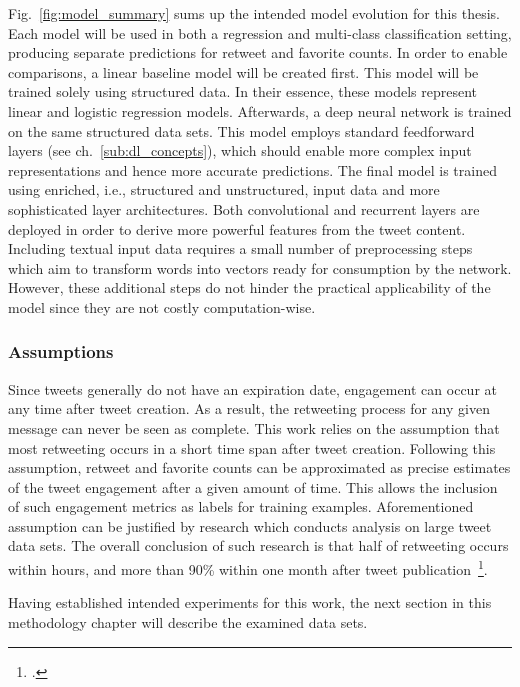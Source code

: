 Fig.~\ref{fig:model_summary} sums up the intended model evolution for this thesis.
Each model will be used in both a regression and multi-class classification
setting, producing separate predictions for retweet and favorite counts.
In order to enable comparisons, a linear baseline model will be created first.
This model will be trained solely using structured data.
In their essence, these models represent linear and logistic regression models.
Afterwards, a deep neural network is trained on the same structured data sets.
This model employs standard feedforward layers (see ch.~\ref{sub:dl_concepts}),
which should enable more complex input representations and hence more accurate
predictions.
The final model is trained using enriched, i.e., structured and unstructured,
input data and more sophisticated layer architectures.
Both convolutional and recurrent layers are deployed in order to derive more
powerful features from the tweet content. 
Including textual input data requires a small number of preprocessing steps which aim
to transform words into vectors ready for consumption by the network.
However, these additional steps do not hinder the practical applicability
of the model since they are not costly computation-wise.

\subsubsection{Assumptions}

Since tweets generally do not have an expiration date, engagement can occur
at any time after tweet creation.
As a result, the retweeting process for any given message can never be seen
as complete.
This work relies on the assumption that most retweeting occurs in a short time
span after tweet creation.
Following this assumption, retweet and favorite counts can be approximated
as precise estimates of the tweet engagement after a given amount of time.
This allows the inclusion of such engagement metrics as labels for training
examples.
Aforementioned assumption can be justified by research which conducts analysis
on large tweet data sets.
The overall conclusion of such research is that half of retweeting occurs within
hours, and more than 90\% within one month after tweet publication~\footcite{Kwak2010, Kupavskii2012, Zaman2014}.

Having established intended experiments for this work, the next section
in this methodology chapter will describe the examined data sets.
